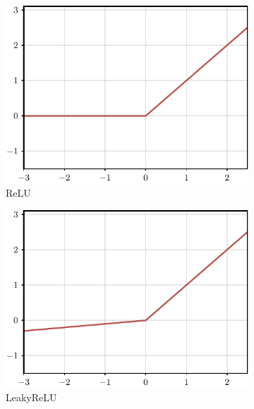 \begin{figure}[t]
    \centering
    \begin{subfigure}[b]{0.18\textwidth}
    \includegraphics[width=\textwidth]{images/activation_function_relu.pdf}
    \caption{ReLU}
    \end{subfigure}
    \hfill
    \begin{subfigure}[b]{0.18\textwidth}
    \includegraphics[width=1.0\textwidth]{images/activation_function_LeakyReLU.pdf}
    \caption{LeakyReLU}
    \end{subfigure}
    \hfill
    \begin{subfigure}[b]{0.18\textwidth}

\end{subfigure}
\end{figure}
